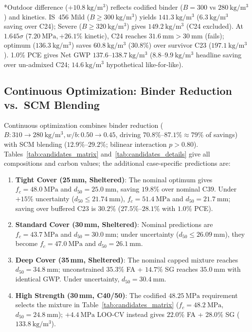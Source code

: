 \documentclass[journal]{IEEEtran}
\begin{document}
\begin{table}[!t]
\begin{minipage}{\textwidth}
\tiny
*Outdoor difference ($+10.8\ \mathrm{kg/m^3}$) reflects codified binder ($B=300$ vs $280\ \mathrm{kg/m^3}$) and kinetics. IS~456 Mild ($B \ge 300\ \mathrm{kg/m^3}$) yields $141.3\ \mathrm{kg/m^3}$ ($6.3\ \mathrm{kg/m^3}$ saving over C24); Severe ($B \ge 320\ \mathrm{kg/m^3}$) gives $149.2\ \mathrm{kg/m^3}$ (C24 excluded). At $1.645\sigma$ ($7.20\ \mathrm{MPa}, +26.1\%$ kinetic), C24 reaches $31.6\ \mathrm{mm} > 30\ \mathrm{mm}$ (fails); optimum ($136.3\ \mathrm{kg/m^3}$) saves $60.8\ \mathrm{kg/m^3}$ ($30.8\%$) over survivor C23 ($197.1\ \mathrm{kg/m^3}$). 1.0\% PCE gives Net GWP $137.6\text{--}138.7\ \mathrm{kg/m^3}$ ($8.8\text{--}9.9\ \mathrm{kg/m^3}$ headline saving over un-admixed C24; $14.6\ \mathrm{kg/m^3}$ hypothetical like-for-like).
\end{minipage}
\end{table}

\subsection{Continuous Optimization: Binder Reduction vs.\ SCM Blending}
Continuous optimization combines binder reduction ($B: 310 \to 280\ \mathrm{kg/m^3}, w/b: 0.50 \to 0.45$, driving $70.8\%\text{--}87.1\% \approx 79\%$ of savings) with SCM blending ($12.9\%\text{--}29.2\%$; bilinear interaction $p > 0.80$). Tables~\ref{tab:candidates_matrix} and~\ref{tab:candidates_details} give all compositions and carbon values; the additional case-specific predictions are:
\begin{enumerate}\setlength{\itemsep}{0pt}\setlength{\parskip}{0pt}
    \item \textbf{Tight Cover (25\,mm, Sheltered)}: The nominal optimum gives $f_c=48.0\ \mathrm{MPa}$ and $d_{50}=25.0\ \mathrm{mm}$, saving $19.8\%$ over nominal C39. Under $+15\%$ uncertainty ($d_{50}\le21.74\ \mathrm{mm}$), $f_c=51.4\ \mathrm{MPa}$ and $d_{50}=21.7\ \mathrm{mm}$; saving over buffered C23 is $30.2\%$ ($27.5\%\text{--}28.1\%$ with $1.0\%$ PCE).
    \item \textbf{Standard Cover (30\,mm, Sheltered)}: Nominal predictions are $f_c=43.7\ \mathrm{MPa}$ and $d_{50}=30.0\ \mathrm{mm}$; under uncertainty ($d_{50}\le26.09\ \mathrm{mm}$), they become $f_c=47.0\ \mathrm{MPa}$ and $d_{50}=26.1\ \mathrm{mm}$.
    \item \textbf{Deep Cover (35\,mm, Sheltered)}: The nominal capped mixture reaches $d_{50}=34.8\ \mathrm{mm}$; unconstrained $35.3\%$ FA + $14.7\%$ SG reaches $35.0\ \mathrm{mm}$ with identical GWP. Under uncertainty, $d_{50}=30.4\ \mathrm{mm}$.
    \item \textbf{High Strength (30\,mm, C40/50)}: The codified $48.25\ \mathrm{MPa}$ requirement selects the mixture in Table~\ref{tab:candidates_matrix} ($f_c=48.2\ \mathrm{MPa}$, $d_{50}=24.8\ \mathrm{mm}$); $+4.4\ \mathrm{MPa}$ LOO-CV instead gives $22.0\%$ FA + $28.0\%$ SG ($133.8\ \mathrm{kg/m^3}$).
\end{enumerate}
\end{document}
